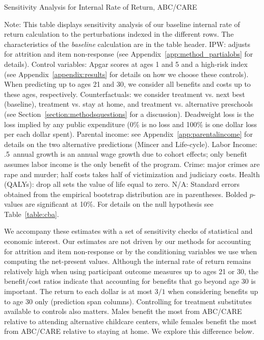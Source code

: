 \begin{table}
\begin{threeparttable}
\caption{Sensitivity Analysis for Internal Rate of Return, ABC/CARE}
\label{table:irrsens}
\centering
\footnotesize

\begin{tablenotes}
\footnotesize
\item Note: This table displays sensitivity analysis of our baseline internal rate of return calculation to the perturbations indexed in the different rows. The characteristics of the \textit{baseline} calculation are in the table header. IPW: adjusts for attrition and item non-response (see Appendix~\ref{app:method_partialobs} for details). Control variables: Apgar scores at ages 1 and 5 and a high-risk index (see Appendix~\ref{appendix:results} for details on how we choose these controls). When predicting up to ages 21 and 30, we consider all benefits and costs up to these ages, respectively. Counterfactuals: we consider treatment vs. next best (baseline), treatment vs. stay at home, and treatment vs. alternative preschools (see Section~\ref{section:methodsquestions} for a discussion). Deadweight loss is the loss implied by any public expenditure (0\% is no loss and 100\% is one dollar loss per each dollar spent). Parental income: see Appendix~\ref{app:parentalincome} for details on the two alternative predictions (Mincer and Life-cycle). Labor Income: .5\ annual growth is an annual wage growth due to cohort effects; only benefit assumes labor income is the only benefit of the program. Crime: major crimes are rape and murder; half costs takes half of victimization and judiciary costs. Health (QALYs): drop all sets the value of life equal to zero. N/A: Standard errors obtained from the empirical bootstrap distribution are in parentheses. Bolded $p$-values are significant at 10\%. For details on the null hypothesis see Table~\ref{table:cba}. 
\end{tablenotes}
\end{threeparttable}
\end{table}
\restoregeometry
\doublespacing

We accompany these estimates with a set of sensitivity checks of statistical and economic interest. Our estimates are not driven by our methods for accounting for attrition and item non-response or by the conditioning variables we use when computing the net-present values. Although the internal rate of return remains relatively high when using participant outcome measures up to ages 21 or 30, the benefit/cost ratios indicate that accounting for benefits that go beyond age 30 is important. The return to each dollar is at most $3/1$ when considering benefits up to age 30 only (prediction span columns). Controlling for treatment substitutes available to controls also matters. Males benefit the most from ABC/CARE relative to attending alternative childcare centers, while females benefit the most from ABC/CARE relative to staying at home. We explore this difference below.

